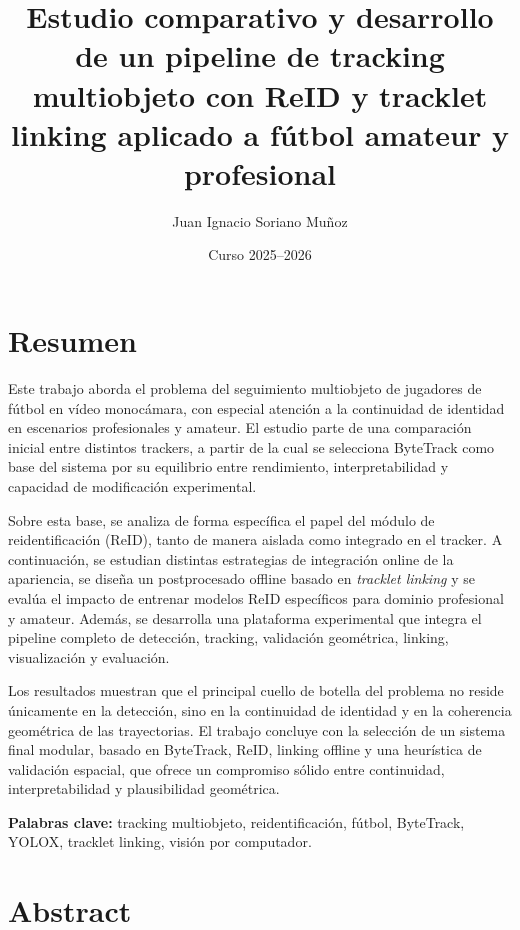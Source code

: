 \documentclass[12pt, a4paper, twoside]{article}
\title{Estudio comparativo y desarrollo de un pipeline de tracking multiobjeto con ReID y tracklet linking aplicado a fútbol amateur y profesional}
\author{Juan Ignacio Soriano Muñoz}
\date{Curso 2025--2026}
\begin{document}
	
	
	
	\clearpage
	\setcounter{page}{1}
	
	
	
	\clearpage
	\section*{Resumen}
	
	Este trabajo aborda el problema del seguimiento multiobjeto de jugadores de fútbol en vídeo monocámara, con especial atención a la continuidad de identidad en escenarios profesionales y amateur. El estudio parte de una comparación inicial entre distintos trackers, a partir de la cual se selecciona ByteTrack como base del sistema por su equilibrio entre rendimiento, interpretabilidad y capacidad de modificación experimental.
	
	Sobre esta base, se analiza de forma específica el papel del módulo de reidentificación (ReID), tanto de manera aislada como integrado en el tracker. A continuación, se estudian distintas estrategias de integración online de la apariencia, se diseña un postprocesado offline basado en \textit{tracklet linking} y se evalúa el impacto de entrenar modelos ReID específicos para dominio profesional y amateur. Además, se desarrolla una plataforma experimental que integra el pipeline completo de detección, tracking, validación geométrica, linking, visualización y evaluación.
	
	Los resultados muestran que el principal cuello de botella del problema no reside únicamente en la detección, sino en la continuidad de identidad y en la coherencia geométrica de las trayectorias. El trabajo concluye con la selección de un sistema final modular, basado en ByteTrack, ReID, linking offline y una heurística de validación espacial, que ofrece un compromiso sólido entre continuidad, interpretabilidad y plausibilidad geométrica.
	
	\textbf{Palabras clave:} tracking multiobjeto, reidentificación, fútbol, ByteTrack, YOLOX, tracklet linking, visión por computador.
	
	\clearpage
	\section*{Abstract}
	
\end{document}
